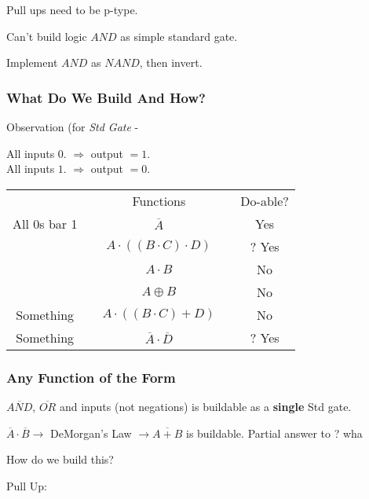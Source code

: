 \documentclass[a4paper,12pt]{article}
\begin{document}
Pull ups need to be p-type.

Can't build logic $AND$ as simple standard gate.

Implement $AND$ as $NAND$, then invert.

\begin{figure}[hbtp]

\centering 



\label{Inverted NAND Gate} 

\end{figure}

\subsubsection*{What Do We Build And How?}

Observation (for \emph{Std Gate} - 

All inputs $0$. $\Rightarrow$ output $= 1$. \\
All inputs $1$. $\Rightarrow$ output $= 0$.

\begin{tabular}{ccccc}
						&	\hspace{10mm}	&	Functions	&	\hspace{10mm}	&	Do-able?	\\
All $0$s bar 1		&					&	$\overline{A}$	&		&	Yes	\\
				&	& $A \cdot ((B \cdot C) \cdot D)$		&		&	? Yes	\\
					&						&	$A \cdot B$		&		&	No	\\
					&						&	$A \oplus B$		&		&	No	\\
Something		&						&	$A \cdot ((B \cdot C) + D)$	&	&	No	\\
Something		&				&	$\overline{A} \cdot \overline{D}$	& 		& ? Yes
\end{tabular}

\subsubsection*{Any Function of the Form}

$\overline{AND}$, $\overline{OR}$ and inputs (not negations) is
buildable as a \textbf{single} Std gate.

$\overline{A} \cdot \overline{B} \to$ DeMorgan's Law $\to
\overline{A+B}$ is buildable. Partial answer to ? wha %

How do we build this?

Pull Up:
\end{document}
